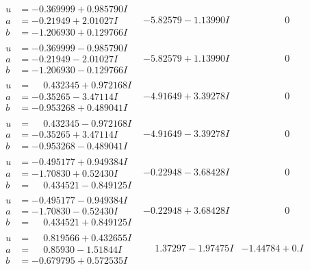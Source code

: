 \documentclass[1p]{elsarticle_modified}
\theoremstyle{definition}
\begin{document}
$$\begin{array}{c|c|c}
\begin{aligned}
u &= -0.369999 + 0.985790 I \\
a &= -0.21949 + 2.01027 I \\
b &= -1.206930 + 0.129766 I\end{aligned}
 & -5.82579 - 1.13990 I & \phantom{-0.000000 } 0 \\ \hline\begin{aligned}
u &= -0.369999 - 0.985790 I \\
a &= -0.21949 - 2.01027 I \\
b &= -1.206930 - 0.129766 I\end{aligned}
 & -5.82579 + 1.13990 I & \phantom{-0.000000 } 0 \\ \hline\begin{aligned}
u &= \phantom{-}0.432345 + 0.972168 I \\
a &= -0.35265 - 3.47114 I \\
b &= -0.953268 + 0.489041 I\end{aligned}
 & -4.91649 + 3.39278 I & \phantom{-0.000000 } 0 \\ \hline\begin{aligned}
u &= \phantom{-}0.432345 - 0.972168 I \\
a &= -0.35265 + 3.47114 I \\
b &= -0.953268 - 0.489041 I\end{aligned}
 & -4.91649 - 3.39278 I & \phantom{-0.000000 } 0 \\ \hline\begin{aligned}
u &= -0.495177 + 0.949384 I \\
a &= -1.70830 + 0.52430 I \\
b &= \phantom{-}0.434521 - 0.849125 I\end{aligned}
 & -0.22948 - 3.68428 I & \phantom{-0.000000 } 0 \\ \hline\begin{aligned}
u &= -0.495177 - 0.949384 I \\
a &= -1.70830 - 0.52430 I \\
b &= \phantom{-}0.434521 + 0.849125 I\end{aligned}
 & -0.22948 + 3.68428 I & \phantom{-0.000000 } 0 \\ \hline\begin{aligned}
u &= \phantom{-}0.819566 + 0.432655 I \\
a &= \phantom{-}0.85930 - 1.51844 I \\
b &= -0.679795 + 0.572535 I\end{aligned}
 & \phantom{-}1.37297 - 1.97475 I & -1.44784 + 0. I\phantom{ +0.000000I} \\ \hline\begin{aligned}

\end{aligned}
\end{array}$$
\end{document}
